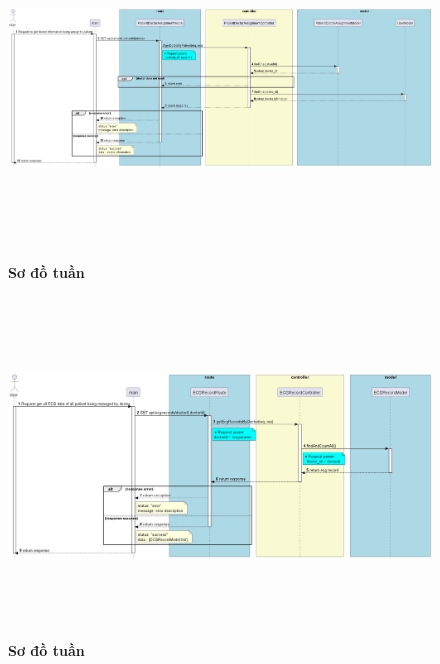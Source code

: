 \begin{figure}[H]
  \centering
  \includegraphics[width=16cm,height=9cm]{Images/server/sequence/server/getDoctorByPatient.png}
  \caption[Sơ đồ tuần tự ]{\bfseries \fontsize{12pt}{0pt}
  \selectfont Sơ đồ tuần }
  \label{hinh21} %
\end{figure}


\begin{figure}[H]
  \centering
  \includegraphics[width=16cm,height=9cm]{Images/server/sequence/server/getEcgRecordsByDoctor.png}
  \caption[Sơ đồ tuần tự ]{\bfseries \fontsize{12pt}{0pt}
  \selectfont Sơ đồ tuần }
  \label{hinh21} %
\end{figure}


